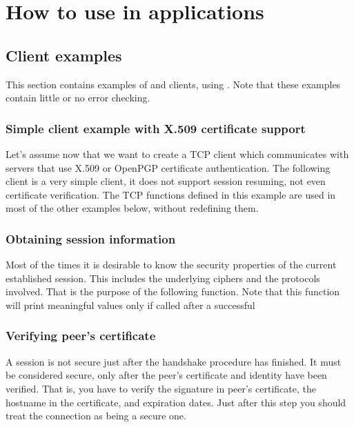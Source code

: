 \chapter{How to use \gnutls{} in applications}



\label{examples}
\section{Client examples}
This section contains examples of \tls{} and \ssl{} clients, using \gnutls{}. 
Note that these examples contain little or no error checking.

\subsection{Simple client example with X.509 certificate support}
Let's assume now that we want to create a TCP client which communicates
with servers that use X.509 or OpenPGP certificate authentication. The following client
is a very simple \tls{} client, it does not support session resuming, not
even certificate verification. The TCP functions defined in this example
are used in most of the other examples below, without redefining them.


\subsection{Obtaining session information}
Most of the times it is desirable to know the security properties of
the current established session. This includes the underlying ciphers and
the protocols involved. That is the purpose of the following function.
Note that this function will print meaningful values only if
called after a successful 



\subsection{Verifying peer's certificate}
A \tls{} session is not secure just after the handshake procedure has finished.
It must be considered secure, only after the peer's certificate and identity have been
verified. That is, you have to verify the signature in peer's 
certificate, the hostname in the certificate, and expiration dates.
Just after this step you should treat the connection as being a secure one.

